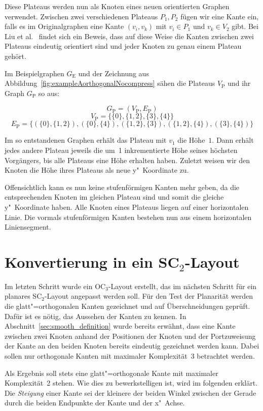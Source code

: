 \documentclass[a4paper]{scrreprt}
\theoremstyle{definition}
\begin{document}
Diese Plateaus werden nun als Knoten eines neuen orientierten Graphen verwendet. Zwischen zwei verschiedenen Plateaus $P_1, P_2$ fügen wir eine Kante ein, falls es im Originalgraphen eine Kante $(v_i, v_k)$ mit $v_i \in P_1$ und $v_k \in V_2$ gibt. Bei Liu et al.~\cite{liu+etal-98} findet sich ein Beweis, dass auf diese Weise die Kanten zwischen zwei Plateaus eindeutig orientiert sind und jeder Knoten zu genau einem Plateau gehört. 

Im Beispielgraphen $G_\text{E}$ und der Zeichnung aus Abbildung~\ref{fig:exampleAorthogonalNocompress} sähen die Plateaus $V_\text{P}$ und ihr Graph $G_\text{P}$ so aus:

\[G_\text{P} = (V_\text{P}, E_\text{P})\]
\[V_\text{P} = \{\{0\}, \{1, 2\}, \{3\}, \{4\}\}\]
\[E_\text{P} = \{(\{0\}, \{1, 2\}), (\{0\}, \{4\}), (\{1, 2\}, \{3\}), (\{1, 2\}, \{4\}), (\{3\}, \{4\})\}\]


Im so entstandenen Graphen erhält das Plateau mit $v_1$ die Höhe~$1$. Dann erhält jedes andere Plateau jeweils die um~1 inkrementierte Höhe seines höchsten Vorgängers, bis alle Plateaus eine Höhe erhalten haben. Zuletzt weisen wir den Knoten die Höhe ihres Plateaus als neue y"~Koordinate zu.

Offensichtlich kann es nun keine stufenförmigen Kanten mehr geben, da die entsprechenden Knoten im gleichen Plateau sind und somit die gleiche y"~Koordinate haben. Alle Knoten eines Plateaus liegen auf einer horizontalen Linie. Die vormals stufenförmigen Kanten bestehen nun aus einem horizontalen Liniensegment.

\section{Konvertierung in ein SC$_2$-Layout}
\label{sec:sc2conversion}

Im letzten Schritt wurde ein OC$_3$-Layout erstellt, das im nächsten Schritt für ein planares SC$_2$-Layout angepasst werden soll. Für den Test der Planarität werden die glatt"=orthogonalen Kanten gezeichnet und auf Überschneidungen geprüft. Dafür ist es nötig, das Aussehen der Kanten zu kennen. In Abschnitt~\ref{sec:smooth_definition} wurde bereits erwähnt, dass eine Kante zwischen zwei Knoten anhand der Positionen der Knoten und der Portzuweisung der Kante an den beiden Knoten bereits eindeutig gezeichnet werden kann. Dabei sollen nur orthogonale Kanten mit maximaler Komplexität~3 betrachtet werden.

Als Ergebnis soll stets eine glatt"=orthogonale Kante mit maximaler Komplexität~2 stehen. Wie dies zu bewerkstelligen ist, wird im folgenden erklärt. Die \emph{Steigung} einer Kante sei der kleinere der beiden Winkel zwischen der Gerade durch die beiden Endpunkte der Kante und der x"~Achse.
\end{document}
